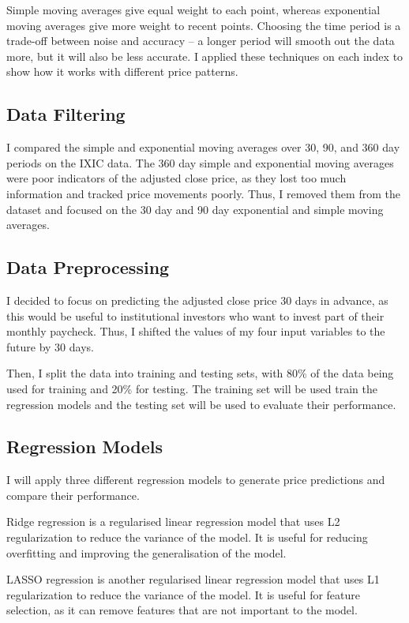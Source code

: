\documentclass[a4paper, 11pt]{article}
\begin{document}
Simple moving averages give equal weight to each point, whereas exponential moving averages give more weight to recent points. Choosing the time period is a trade-off between noise and accuracy -- a longer period will smooth out the data more, but it will also be less accurate. I applied these techniques on each index to show how it works with different price patterns.

\subsection{Data Filtering}
I compared the simple and exponential moving averages over 30, 90, and 360 day periods on the IXIC data. The 360 day simple and exponential moving averages were poor indicators of the adjusted close price, as they lost too much information and tracked price movements poorly. Thus, I removed them from the dataset and focused on the 30 day and 90 day exponential and simple moving averages.

\subsection{Data Preprocessing}
I decided to focus on predicting the adjusted close price 30 days in advance, as this would be useful to institutional investors who want to invest part of their monthly paycheck. Thus, I shifted the values of my four input variables to the future by 30 days.

Then, I split the data into training and testing sets, with 80\% of the data being used for training and 20\% for testing. The training set will be used train the regression models and the testing set will be used to evaluate their performance.

\subsection{Regression Models}
I will apply three different regression models to generate price predictions and compare their performance.

Ridge regression is a regularised linear regression model that uses L2 regularization to reduce the variance of the model. It is useful for reducing overfitting and improving the generalisation of the model.

LASSO regression is another regularised linear regression model that uses L1 regularization to reduce the variance of the model. It is useful for feature selection, as it can remove features that are not important to the model.
\end{document}
